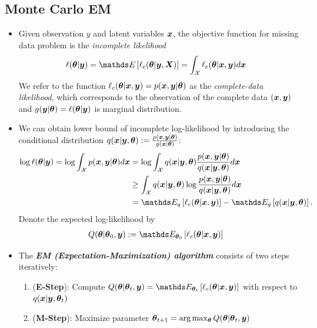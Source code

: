\documentclass[11pt]{article}
\begin{document}
\subsection{Monte Carlo EM}
\begin{itemize}
\item Given observation $y$ and latent variables $\boldsymbol{x}$, the objective function for missing data problem is the \emph{incomplete likelihood}
\begin{align*}
\ell(\mb{\theta}|\mb{y}) &= \E{}{\ell_{c}(\mb{\theta}|\mb{y}, \mb{X})} = \int_{\cX}\ell_{c}(\mb{\theta}|\mb{x}, \mb{y})d\mb{x}
\end{align*} We refer to the function $\ell_{c}(\boldsymbol{\theta}|\boldsymbol{x}, \boldsymbol{y}) = p(\boldsymbol{x}, \boldsymbol{y} | \boldsymbol{\theta})$ as the \emph{complete-data likelihood}, which corresponds to the observation of the complete data $(\boldsymbol{x}, \boldsymbol{y})$ and $g(\boldsymbol{y}|\boldsymbol{\theta}) = \ell(\boldsymbol{\theta}|\boldsymbol{y}) $ is marginal distribution.

\item We can obtain lower bound of incomplete log-likelihood by introducing the conditional distribution $q(\boldsymbol{x}|\boldsymbol{y},\boldsymbol{\theta}):= \frac{p(\boldsymbol{x}, \boldsymbol{y} | \boldsymbol{\theta})}{g(\boldsymbol{x}| \boldsymbol{\theta})}$:
\begin{align*}
\log\ell(\mb{\theta}|\mb{y})  = \log \int_{\cX}p(\mb{x}, \mb{y} | \mb{\theta})d\mb{x} 
&= \log \int_{\cX} q(\mb{x}|\mb{y},\mb{\theta}) \frac{p(\mb{x}, \mb{y} | \mb{\theta})}{q(\mb{x}|\mb{y},\mb{\theta})}  d\mb{x} \\
&\ge \int_{\cX}q(\mb{x}|\mb{y},\mb{\theta})\log\frac{p(\mb{x}, \mb{y} | \mb{\theta})}{q(\mb{x}|\mb{y},\mb{\theta})}  d\mb{x}  \\
&= \E{q}{\ell_{c}(\mb{\theta}|\mb{x}, \mb{y})} - \E{q}{q(\mb{x}|\mb{y},\mb{\theta})}.
\end{align*} Denote the expected log-likelihood by
\begin{align*}
Q(\mb{\theta}|\mb{\theta}_{0}, \mb{y}) &:= \E{\mb{\theta}_{0}}{\ell_{c}(\mb{\theta}|\mb{x}, \mb{y})} 
\end{align*} 

\item The \emph{\textbf{EM (Expectation-Maximization) algorithm}} consists of two steps iteratively:
\begin{enumerate}
\item (\textbf{E-Step}): Compute $Q(\mb{\theta}|\mb{\theta}_{t}, \mb{y}) = \E{\mb{\theta}_{t}}{\ell_{c}(\mb{\theta}|\mb{x}, \mb{y})} $ with respect to $q(\boldsymbol{x}|\boldsymbol{y},\boldsymbol{\theta}_t)$
\item (\textbf{M-Step}): Maximize parameter $\boldsymbol{\theta}_{t+1} = \arg\max_{\boldsymbol{\theta}}Q(\boldsymbol{\theta}|\boldsymbol{\theta}_{t}, \boldsymbol{y})$
\end{enumerate}


\end{itemize}
\end{document}
